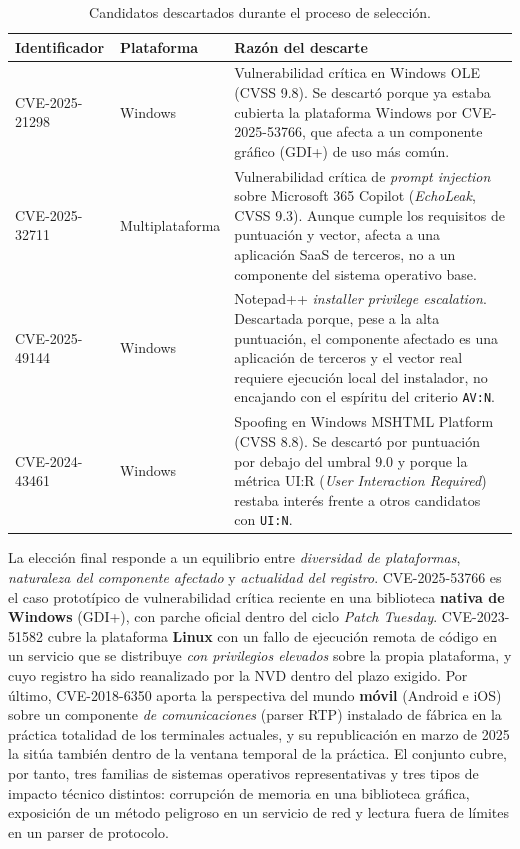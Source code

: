 \begin{table}[H]
\centering
\renewcommand{\arraystretch}{1.3}
\begin{tabularx}{\textwidth}{|l|l|X|}
\hline
\rowcolor{lightblue}
\textbf{Identificador} & \textbf{Plataforma} & \textbf{Razón del descarte} \\ \hline
CVE-2025-21298 & Windows & Vulnerabilidad crítica en Windows OLE (CVSS 9.8). Se descartó porque ya estaba cubierta la plataforma Windows por CVE-2025-53766, que afecta a un componente gráfico (GDI+) de uso más común. \\ \hline
CVE-2025-32711 & Multiplataforma & Vulnerabilidad crítica de \textit{prompt injection} sobre Microsoft 365 Copilot (\textit{EchoLeak}, CVSS 9.3). Aunque cumple los requisitos de puntuación y vector, afecta a una aplicación SaaS de terceros, no a un componente del sistema operativo base. \\ \hline
CVE-2025-49144 & Windows & Notepad++ \textit{installer privilege escalation}. Descartada porque, pese a la alta puntuación, el componente afectado es una aplicación de terceros y el vector real requiere ejecución local del instalador, no encajando con el espíritu del criterio \texttt{AV:N}. \\ \hline
CVE-2024-43461 & Windows & Spoofing en Windows MSHTML Platform (CVSS 8.8). Se descartó por puntuación por debajo del umbral 9.0 y porque la métrica UI:R (\textit{User Interaction Required}) restaba interés frente a otros candidatos con \texttt{UI:N}. \\ \hline
\end{tabularx}
\caption{Candidatos descartados durante el proceso de selección.}
\end{table}

La elección final responde a un equilibrio entre \textit{diversidad de plataformas}, \textit{naturaleza del componente afectado} y \textit{actualidad del registro}. CVE-2025-53766 es el caso prototípico de vulnerabilidad crítica reciente en una biblioteca \textbf{nativa de Windows} (GDI+), con parche oficial dentro del ciclo \textit{Patch Tuesday}. CVE-2023-51582 cubre la plataforma \textbf{Linux} con un fallo de ejecución remota de código en un servicio que se distribuye \textit{con privilegios elevados} sobre la propia plataforma, y cuyo registro ha sido reanalizado por la NVD dentro del plazo exigido. Por último, CVE-2018-6350 aporta la perspectiva del mundo \textbf{móvil} (Android e iOS) sobre un componente \textit{de comunicaciones} (parser RTP) instalado de fábrica en la práctica totalidad de los terminales actuales, y su republicación en marzo de 2025 la sitúa también dentro de la ventana temporal de la práctica. El conjunto cubre, por tanto, tres familias de sistemas operativos representativas y tres tipos de impacto técnico distintos: corrupción de memoria en una biblioteca gráfica, exposición de un método peligroso en un servicio de red y lectura fuera de límites en un parser de protocolo.
